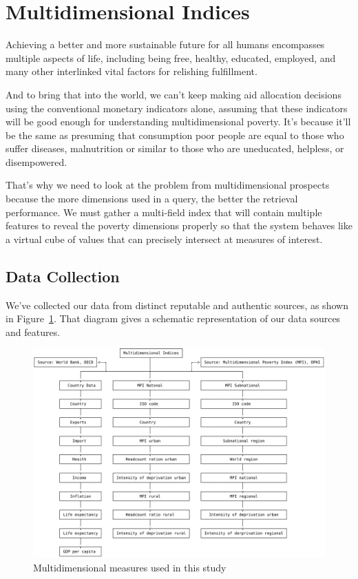 \documentclass{swfuthesise}
\begin{document}
\section{Multidimensional Indices}

Achieving a better and more sustainable future for all humans encompasses multiple aspects of life, including being free, healthy, educated, employed, and many other interlinked vital factors for relishing fulfillment.

And to bring that into the world, we can't keep making aid allocation decisions using the conventional monetary indicators alone, assuming that these indicators will be good enough for understanding multidimensional poverty. It's because it'll be the same as presuming that consumption poor people are equal to those who suffer diseases, malnutrition or similar to those who are uneducated, helpless, or disempowered.

That's why we need to look at the problem from multidimensional prospects because the more dimensions used in a query, the better the retrieval performance. We must gather a multi-field index that will contain multiple features to reveal the poverty dimensions properly so that the system behaves like a virtual cube of values that can precisely intersect at measures of interest.

\subsection{Data Collection}

We've collected our data from distinct reputable and authentic sources, as shown in
Figure~\ref{fig:multidimensional}. That diagram gives a schematic representation of our
data sources and features.

\begin{figure}[!htp]
  \centering
  \includegraphics[width=\linewidth]{figs/multidimensional-indices}
  \caption{Multidimensional measures used in this study}
  \label{fig:multidimensional}
\end{figure}
\end{document}
